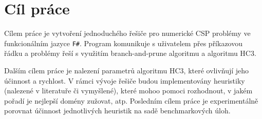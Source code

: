 \chapter{Cíl práce}
Cílem práce je vytvoření jednoduchého řešiče pro numerické CSP problémy ve funkcionálním jazyce \texttt{F\#}. Program komunikuje s uživatelem přes příkazovou řádku a problémy řeší s využitím branch-and-prune algoritmu a algoritmu HC3.

Dalším cílem práce je nalezení parametrů algoritmu HC3, které ovlivňují jeho účinnost a rychlost. V rámci vývoje řešiče budou implementovány heuristiky (nalezené v literatuře či vymyšlené), které mohoo pomoci rozhodnout, v jakém pořadí je nejlepší domény zužovat, atp. Posledním cílem práce je experimentálně porovnat účinnost jednotlivých heuristik na sadě benchmarkových úloh.